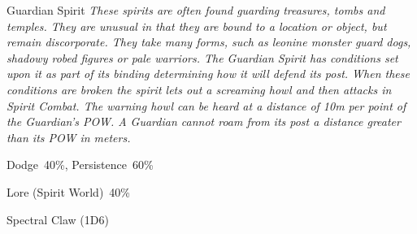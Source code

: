 \begin{monsterbox}{Guardian Spirit}
	\textit{These spirits are often found guarding treasures, tombs and temples. They are unusual in that they are bound to a location or object, but remain discorporate. They take many forms, such as leonine monster guard dogs, shadowy robed figures or pale warriors. The Guardian Spirit has conditions set upon it as part of its binding determining how it will defend its post. When these conditions are broken the spirit lets out a screaming howl and then attacks in Spirit Combat. The warning howl can be heard at a distance of 10m per point of the Guardian’s POW. A Guardian cannot roam from its post a distance greater than its POW in meters.}\\
	\rpghline
	\basics[%
	powerpoints = 17,
	movementrate = 30m,
	plunderrating = (depends on the Treasure being guarded)
	]
	\rpghline%
	\stats[ %
		STR = -,
		CON = -,
		DEX = -,
		SIZ = -,
		INT = 2D6    (7),
		POW = 3D6+6  (17),
		CHA = 3D6    (11)
	]
	\rpghline%
	\begin{rpg-monsteraction}[Resistances]
		Dodge~40\%, Persistence~60\%
	\end{rpg-monsteraction}
	\begin{rpg-monsteraction}[Knowledge]
		Lore (Spirit World)~40\%
	\end{rpg-monsteraction}
	\begin{rpg-monsteraction}
		Spectral Claw (1D6)
	\end{rpg-monsteraction}
\end{monsterbox}

\newpage 

